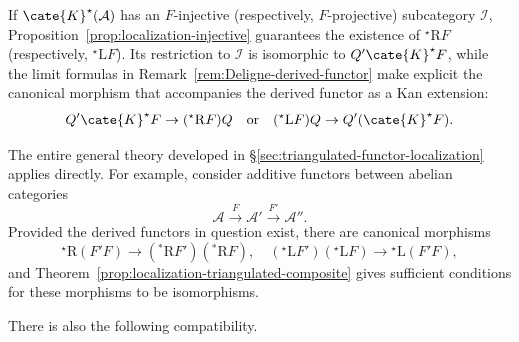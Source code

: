 If $\cate{K}^\star(\mathcal{A})$ has an $F$-injective (respectively,
$F$-projective) subcategory $\mathcal{I}$,
Proposition~\ref{prop:localization-injective} guarantees the existence of
${}^\star\mathrm{R}F$ (respectively, ${}^\star\mathrm{L}F$). Its restriction
to $\mathcal{I}$ is isomorphic to $Q'\cate{K}^\star F$, while the limit
formulas in Remark~\ref{rem:Deligne-derived-functor} make explicit the
canonical morphism that accompanies the derived functor as a Kan extension:
\begin{equation}\label{eqn:L-R-can}
	Q' \cate{K}^\star F \to ({}^\star \mathrm{R}F)Q \quad \text{or} \quad ({}^\star \mathrm{L}F)Q \to Q' (\cate{K}^\star F).
\end{equation}

The entire general theory developed in
\S\ref{sec:triangulated-functor-localization} applies directly. For example,
consider additive functors between abelian categories
\[ \mathcal{A} \xrightarrow{F} \mathcal{A}' \xrightarrow{F'} \mathcal{A}'' . \]
Provided the derived functors in question exist, there are canonical morphisms
\[ {}^\star \mathrm{R}(F'F) \to ({}^* \mathrm{R}F')({}^* \mathrm{R}F), \quad \left( {}^\star \mathrm{L}F' \right) \left( {}^\star \mathrm{L}F \right) \to {}^\star \mathrm{L}(F' F), \]
and Theorem~\ref{prop:localization-triangulated-composite} gives sufficient
conditions for these morphisms to be isomorphisms.

There is also the following compatibility.

